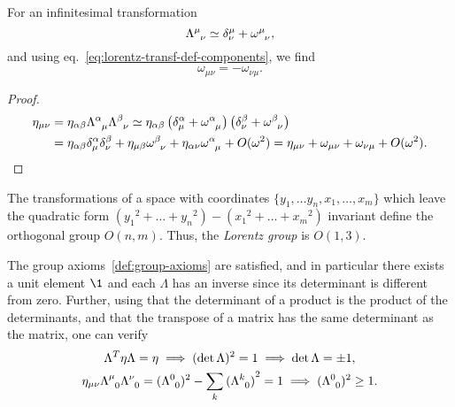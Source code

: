For an infinitesimal transformation
\begin{equation}
    \tensor{\Lambda}{^\mu_\nu} \simeq \delta^\mu_\nu + \tensor{\omega}{^\mu_\nu} ,
\end{equation}
and using eq.~\eqref{eq:lorentz-transf-def-components}, we find
\begin{equation}\label{eq:parameters-lorentz}
    \omega_{\mu\nu} = -\omega_{\nu\mu} .
\end{equation}
\begin{proof}
    \begin{equation}
    \begin{split}
        \eta_{\mu\nu} &= \eta_{\alpha\beta} \tensor{\Lambda}{^\alpha_\mu} \tensor{\Lambda}{^\beta_\nu}
        \simeq \eta_{\alpha\beta} \left( \delta^\alpha_\mu + \tensor{\omega}{^\alpha_\mu} \right) \left(  \delta^\beta_\nu + \tensor{\omega}{^\beta_\nu} \right) 
        \\ &= \eta_{\alpha\beta} \delta^\alpha_\mu \delta^\beta_\nu + \eta_{\mu\beta} \tensor{\omega}{^\beta_\nu} + \eta_{\alpha\nu} \tensor{\omega}{^\alpha_\mu} + O(\omega^2)
        = \eta_{\mu\nu} + \omega_{\mu\nu} + \omega_{\nu\mu} + O(\omega^2) . \qedhere
    \end{split}
    \end{equation}
\end{proof}

The transformations of a space with coordinates $\{y_1, \dots y_n, x_1, \dots, x_m\}$ which leave the quadratic form $( {y_1}^2 + \dots + {y_n}^2 ) - ( {x_1}^2 + \dots + {x_m}^2 )$ invariant define the orthogonal group $O(n,m)$. Thus, the \emph{Lorentz group} is $O(1,3)$.

The group axioms~\ref{def:group-axioms} are satisfied, and in particular there exists a unit element $\1$ and each $\Lambda$ has an inverse since its determinant is different from zero. Further, using that the determinant of a product is the product of the determinants, and that the transpose of a matrix has the same determinant as the matrix, one can verify
\begin{subequations}
\begin{gather}
    \Lambda^T \eta \Lambda = \eta \implies (\det \Lambda)^2 = 1 \implies \det \Lambda = \pm 1 , \\
    \eta_{\mu\nu} \tensor{\Lambda}{^\mu_0} \tensor{\Lambda}{^\nu_0} = (\tensor{\Lambda}{^0_0})^2 - \sum_k {(\tensor{\Lambda}{^k_0})}^2 = 1 \implies (\tensor{\Lambda}{^0_0})^2 \geq 1 .
\end{gather}
\end{subequations}

